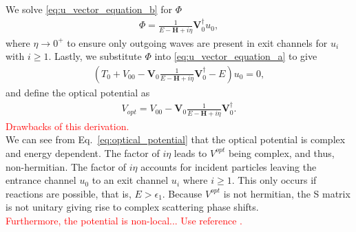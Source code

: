 \documentclass[preprintnumbers,floatfix,aps,prc,preprint,nofootinbib]{revtex4-1}
\begin{document}
%
We solve \ref{eq:u_vector_equation_b} for $\Phi$
%
\begin{eqnarray}
	\label{eq:phi}
	\Phi = \frac{1}{E - \textbf{H} + i \eta} \textbf{V}_0^{\dagger} u_0,
\end{eqnarray}
%
where $\eta \rightarrow 0^+$ to ensure only outgoing waves are present in exit channels for $u_i$ with $i \geq 1$. Lastly, we substitute $\Phi$ into \ref{eq:u_vector_equation_a} to give
%
\begin{eqnarray}
	\label{eq:u0_equation}
	(T_0 + V_{00}  - \textbf{V}_0 \frac{1}{E-\textbf{H}+i\eta} \textbf{V}_0^{\dagger} - E) u_0 = 0,
\end{eqnarray}
%
and define the optical potential as
%
\begin{eqnarray}
	\label{eq:optical_potential}
	V_{opt} = V_{00}  - \textbf{V}_0 \frac{1}{E-\textbf{H}+i\eta} \textbf{V}_0^{\dagger}.
\end{eqnarray}
%
\textcolor{red}{Drawbacks of this derivation.}
\\

We can see from Eq.~\ref{eq:optical_potential} that the optical potential is complex and energy dependent. The factor of $i \eta$ leads to $V^{opt}$ being complex, and thus, non-hermitian. The factor of $i \eta$ accounts for incident particles leaving the entrance channel $u_0$ to an exit channel $u_i$ where $i \geq 1$. This only occurs if reactions are possible, that is, $E > \epsilon_1$. Because $V^{opt}$ is not hermitian, the S matrix is not unitary giving rise to complex scattering phase shifts.
\\

\textcolor{red}{Furthermore, the potential is non-local... Use reference \cite{Hodgson:1971ab}.}
\\
\end{document}
